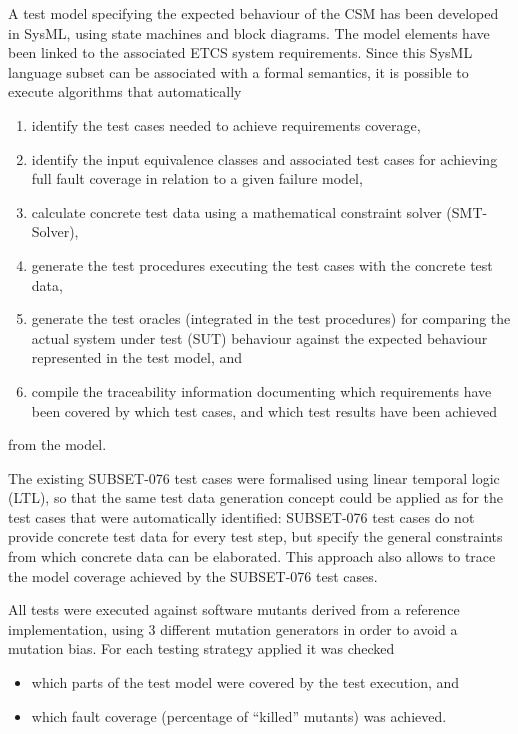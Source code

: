 A test model specifying the expected behaviour of the CSM has been developed 
in SysML, using state machines and block diagrams.  The model elements have been linked to the associated ETCS system requirements.  Since this SysML language subset 
can be associated with a formal semantics, it is possible to execute algorithms that automatically
\begin{enumerate}
\item identify the test cases needed to achieve requirements coverage,
\item identify the input equivalence classes and associated test cases for achieving 
full fault coverage in relation to a given failure model,
\item calculate concrete test data using a mathematical constraint solver (SMT-Solver),
\item generate the test procedures executing the test cases with the concrete test data,
\item generate the test oracles (integrated in the test procedures) for comparing 
the actual system under test (SUT) behaviour against the expected behaviour represented in the test model, and
\item  compile the traceability information documenting which requirements have been covered by which test cases, and which test results have been achieved
\end{enumerate}
from the model.

The existing SUBSET-076 test cases were formalised using linear temporal logic (LTL), 
so that the same test data generation concept could be applied as for the test cases that were automatically identified: SUBSET-076 test cases do not provide concrete test 
data for every test step, but specify the general constraints from which concrete
data can be elaborated.  This approach also allows to trace the model coverage achieved by the SUBSET-076 test cases.

All tests were executed against software mutants derived from a reference implementation, using 3 different mutation generators in order to avoid a mutation bias. For each 
testing strategy applied it was checked 
\begin{itemize}
\item which parts of the test model were covered by the test execution, and
\item which fault coverage (percentage of ``killed'' mutants) was achieved.
\end{itemize}





